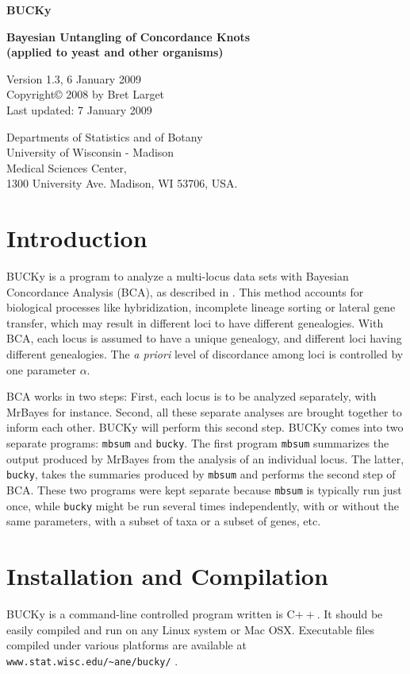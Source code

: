 \documentclass[12pt,english,final,letterpaper]{article}
\newcommand{\bu}{BUCKy}
\begin{document}
\begin{center}
{\Large\bf BUCKy}

{\bf Bayesian Untangling of Concordance Knots\\
(applied to yeast and other organisms)}
\bigskip

Version 1.3, 6 January 2009\\
Copyright\copyright{} 2008 by Bret Larget\\
Last updated: 7 January 2009
\medskip

{\small
Departments of Statistics and of Botany\\ 
University of Wisconsin - Madison\\ 
Medical Sciences Center,\\ 
1300 University Ave. Madison, WI 53706, USA.
}
\end{center}


\section{Introduction}
\bu{} is a program to analyze a multi-locus data sets with 
Bayesian Concordance Analysis (BCA), as described in \cite{ane-etal-2007}.
This method accounts for biological processes like hybridization, 
incomplete lineage sorting or lateral gene transfer, which may result
in different loci to have different genealogies. With BCA,
each locus is assumed to have a unique genealogy, and different
loci having different genealogies. The {\it a priori} level of 
discordance among loci is controlled by one parameter $\alpha$.

BCA works in two steps: First, each locus is to be analyzed 
separately, with MrBayes for instance. Second, all these separate
analyses are brought together to inform each other. \bu{} will
perform this second step.
\bu{} comes into two separate programs: {\tt mbsum} and {\tt bucky}.
The first program {\tt mbsum} summarizes the output produced by MrBayes
from the analysis of an individual locus. The latter, {\tt bucky}, 
takes the summaries produced by {\tt mbsum} and performs the second step
of BCA. These two programs were kept separate because {\tt mbsum}
is typically run just once, while {\tt bucky} might be run several
times  independently, with or without the same parameters, with
a subset of taxa or a subset of genes, etc.

\section{Installation and Compilation}
\bu{} is a command-line controlled program written is C$++$.
It should be easily compiled and run on any Linux system or Mac OSX.
Executable files compiled under various platforms are available
at \verb+www.stat.wisc.edu/~ane/bucky/+ .
\end{document}
